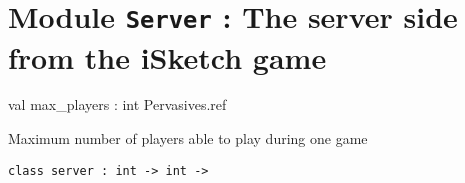 \documentclass[11pt]{article}
\begin{document}
\tableofcontents
\section{Module {\tt{Server}} : The server side from the iSketch game}
\label{module:Server}




\ocamldocvspace{0.5cm}



\label{val:Server.max-underscoreplayers}\begin{ocamldoccode}
val max_players : int Pervasives.ref
\end{ocamldoccode}
\begin{ocamldocdescription}
Maximum number of players able to play during one game


\end{ocamldocdescription}




\begin{ocamldoccode}
{\tt{class server : }}{\tt{int -> int -> }}\end{ocamldoccode}
\label{class:Server.server}
\end{document}
